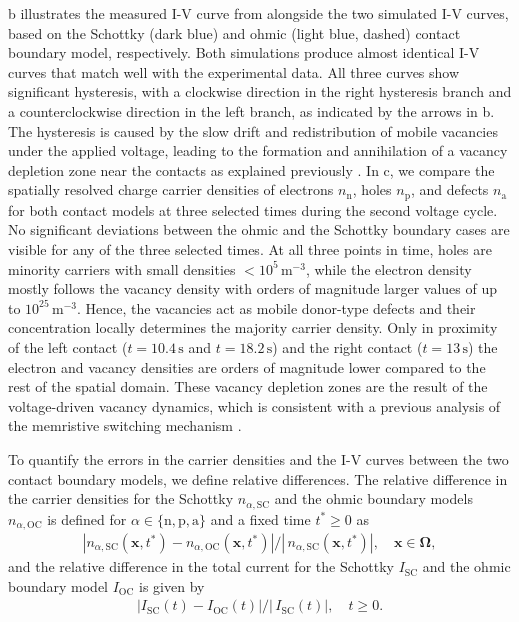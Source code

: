 \documentclass[10pt,a4paper, final]{article}
\def\electrons{\text{n}}
\def\holes{\text{p}}
\def\ions{\text{a}}
\theoremstyle{definition}								%
\numberwithin{equation}{section}
\numberwithin{figure}{section}
\numberwithin{theorem}{section}
\begin{document}
b illustrates the measured I-V curve from \cite{DaLi.2018} alongside the two simulated I-V curves, based on the Schottky (dark blue) and ohmic (light blue, dashed) contact boundary model, respectively.
Both simulations produce almost identical I-V curves that match well with the experimental data.
All three curves show significant hysteresis, with a clockwise direction in the right hysteresis branch and a counterclockwise direction in the left branch, as indicated by the arrows in b.
The hysteresis is caused by the slow drift and redistribution of mobile vacancies under the applied voltage, leading to the formation and annihilation of a vacancy depletion zone near the contacts as explained previously \cite{Spetzler.2024}.
In c, we compare the spatially resolved charge carrier densities of electrons $n_\electrons$, holes $n_\holes$, and defects $n_\ions$ for both contact models at three selected times during the second voltage cycle.
No significant deviations between the ohmic and the Schottky boundary cases are visible for any of the three selected times.
At all three points in time, holes are minority carriers with small densities $<10^5\,\mathrm{m}^{-3}$, while the electron density mostly follows the vacancy density with orders of magnitude larger values of up to $10^{25}\,\mathrm{m}^{-3}$.
Hence, the vacancies act as mobile donor-type defects and their concentration locally determines the majority carrier density.
Only in proximity of the left contact ($t = 10.4\,\mathrm{s}$ and $t = 18.2\,\mathrm{s}$) and the right contact ($t = 13\,\mathrm{s}$) the electron and vacancy densities are orders of magnitude lower compared to the rest of the spatial domain.
These vacancy depletion zones are the result of the voltage-driven vacancy dynamics, which is consistent with a previous analysis of the memristive switching mechanism \cite{Spetzler.2024}.

To quantify the errors in the carrier densities and the I-V curves between the two contact boundary models, we define relative differences. The relative difference in the carrier densities for the Schottky $n_{\alpha, \text{SC}}$ and the ohmic boundary models $n_{\alpha, \text{OC}}$ is defined for $\alpha \in \{ \electrons, \holes, \ions\}$ and a fixed time $t^* \geq 0$ as
\begin{align} \label{eq:error-dens}
\left| n_{\alpha, \text{SC}}(\mathbf{x}, t^*) - n_{\alpha, \text{OC}}(\mathbf{x}, t^*) \right| / \left| \, n_{\alpha, \text{SC}}(\mathbf{x}, t^*) \right|,
\quad
\mathbf{x} \in \mathbf{\Omega},
\end{align}
and the relative difference in the total current for the Schottky $I_{\text{SC}}$ and the ohmic boundary model $ I_{\text{OC}}$ is given by
\begin{align}\label{eq:error-IV}
\left| I_{\text{SC}}(t) - I_{\text{OC}}(t) \right| / \left| \, I_{\text{SC}}(t) \right|,
\quad
t \geq 0.
\end{align}
\end{document}
